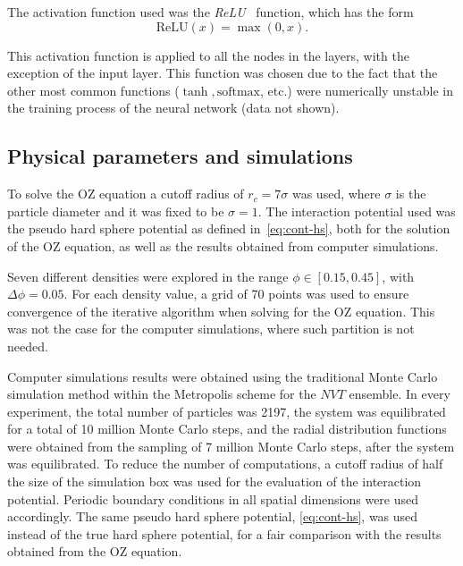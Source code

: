 The activation function used was the \emph{ReLU}~\cite{glorotDeepSparseRectifier2011}
function, which has the form
\begin{equation*}
    \text{ReLU}(x) = \max{(0, x)} .
\end{equation*}

This activation function is applied to all the nodes in the layers, with the exception
of the input layer. This function was chosen due to the fact that the other most common
functions ($\tanh, \text{softmax}$, etc.) were numerically unstable in the training process 
of the neural network (data not shown).

\subsection{Physical parameters and simulations}

To solve the OZ equation a cutoff radius of $r_c=7\sigma$ was used, where $\sigma$ is the
particle diameter and it was fixed to be $\sigma=1$.
The interaction potential used was the pseudo hard sphere potential as defined 
in~\autoref{eq:cont-hs}, both for the solution of the OZ equation, as well as the results 
obtained from computer simulations.

Seven different densities were explored in the range $\phi \in [\num{0.15}, \num{0.45}]$, 
with $\Delta \phi = \num{0.05}$.
For each density value, a grid of 70 points was used to ensure convergence of the iterative
algorithm when solving for the OZ equation. This was not the case for the computer 
simulations, where such partition is not needed.

Computer simulations results were obtained using the traditional Monte Carlo simulation
method within the Metropolis scheme for the $NVT$ ensemble. In every experiment, the total 
number of particles was 2197,
the system was equilibrated for a total of 10 million Monte Carlo steps, and the radial
distribution functions were obtained from the sampling of 7 million Monte Carlo steps, after
the system was equilibrated. To reduce the number of computations, a cutoff radius of
half the size of the simulation box was used for the evaluation of the interaction 
potential. Periodic boundary conditions in all spatial dimensions were used accordingly. 
The same pseudo hard sphere potential, \autoref{eq:cont-hs}, was used instead
of the true hard sphere potential, for a fair comparison with the results obtained from the 
OZ equation.

